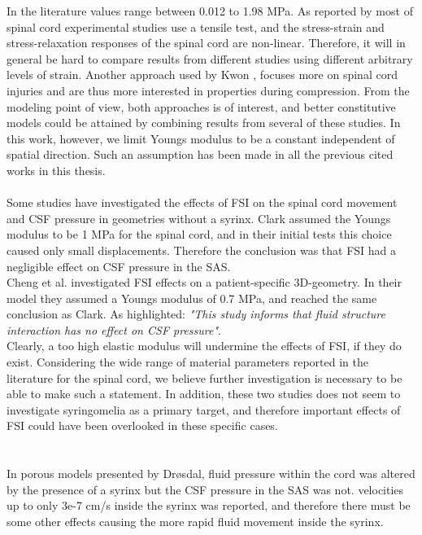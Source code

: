 In the literature values range between 0.012 to 1.98 MPa. As reported by \cite{Clar10} most of spinal cord experimental studies use a tensile test, and the stress-strain and stress-relaxation responses of the spinal cord are non-linear. Therefore, it will in general be hard to compare results from different studies using different arbitrary levels of strain. Another approach used by Kwon \cite{Kwon02}, focuses more on spinal cord injuries and are thus more interested in properties during compression. From the modeling point of view, both approaches is of interest, and better constitutive models could be attained by combining results from several of these studies. In this work, however, we limit Youngs modulus to be a constant independent of spatial direction. Such an assumption has been made in all the previous cited works in this thesis. 
\\
\\
Some studies have investigated the effects of FSI on the spinal cord movement and CSF pressure in geometries without a syrinx. Clark \cite{Clar13} assumed the Youngs modulus to be 1 MPa for the spinal cord, and in their initial tests this choice caused only small displacements. Therefore the conclusion was that FSI had a negligible effect on CSF pressure in the SAS. \\
Cheng et al. \cite{Chen14} investigated FSI effects on a patient-specific 3D-geometry. In their model they assumed a Youngs modulus of 0.7 MPa, and reached the same conclusion as Clark. As highlighted: \textit{"This study informs that fluid structure interaction has no effect on CSF pressure"}. 
\\ Clearly, a too high elastic modulus will undermine the effects of FSI, if they do exist. Considering the wide range of material parameters reported in the literature for the spinal cord, we believe further investigation is necessary to be able to make such a statement. In addition, these two studies does not seem to investigate syringomelia as a primary target, and therefore important effects of FSI could have been overlooked in these specific cases. \\
\\
\\
In porous models presented by Dr{\o}sdal, \cite{Dros11} fluid pressure within the cord was altered by the presence of a syrinx but the CSF pressure in the SAS was not. velocities up to only 3e-7 cm/s inside the syrinx was reported, and therefore there must be some other effects causing the more rapid fluid movement inside the syrinx.  
